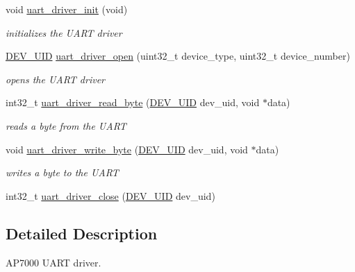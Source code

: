 \begin{CompactItemize}
\item 
\hypertarget{group___u_a_r_t___d_r_i_v_e_r_g4d1dc433ab7e055098aabcf36ee3b8b9}{
void \hyperlink{group___u_a_r_t___d_r_i_v_e_r_g4d1dc433ab7e055098aabcf36ee3b8b9}{uart\_\-driver\_\-init} (void)}
\label{group___u_a_r_t___d_r_i_v_e_r_g4d1dc433ab7e055098aabcf36ee3b8b9}

\begin{CompactList}\small\item\em initializes the UART driver \item\end{CompactList}\item 
\hyperlink{group___d_e_v_i_c_e___a_p_i_g9f427f7fc1dc07b788af60c2aaa6b8d3}{DEV\_\-UID} \hyperlink{group___u_a_r_t___d_r_i_v_e_r_g21a2031520a7294468c5e6f74829a741}{uart\_\-driver\_\-open} (uint32\_\-t device\_\-type, uint32\_\-t device\_\-number)
\begin{CompactList}\small\item\em opens the UART driver \item\end{CompactList}\item 
int32\_\-t \hyperlink{group___u_a_r_t___d_r_i_v_e_r_ga6928ddd61de1141bef635bdf78c178a}{uart\_\-driver\_\-read\_\-byte} (\hyperlink{group___d_e_v_i_c_e___a_p_i_g9f427f7fc1dc07b788af60c2aaa6b8d3}{DEV\_\-UID} dev\_\-uid, void $\ast$data)
\begin{CompactList}\small\item\em reads a byte from the UART \item\end{CompactList}\item 
void \hyperlink{group___u_a_r_t___d_r_i_v_e_r_gfa04867da082deef4ff11e19691b0a7d}{uart\_\-driver\_\-write\_\-byte} (\hyperlink{group___d_e_v_i_c_e___a_p_i_g9f427f7fc1dc07b788af60c2aaa6b8d3}{DEV\_\-UID} dev\_\-uid, void $\ast$data)
\begin{CompactList}\small\item\em writes a byte to the UART \item\end{CompactList}\item 
int32\_\-t \hyperlink{group___u_a_r_t___d_r_i_v_e_r_ga894da78cf2a50d46371a5db778827b6}{uart\_\-driver\_\-close} (\hyperlink{group___d_e_v_i_c_e___a_p_i_g9f427f7fc1dc07b788af60c2aaa6b8d3}{DEV\_\-UID} dev\_\-uid)
\end{CompactItemize}


\subsection{Detailed Description}
AP7000 UART driver. 

